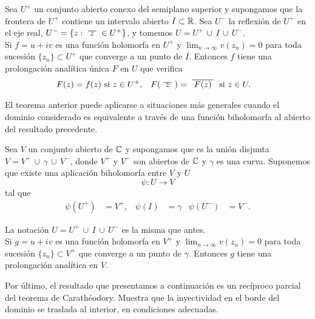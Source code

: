 \begin{theorem}
    Sea $U^+$ un conjunto abierto conexo del semiplano superior y supongamos que la frontera de $U^+$ contiene un intervalo abierto $I \subset \mathbb{R}$. Sea $U^-$ la reflexión de $U^+$ en el eje real, $U^- = \{z: \xbar{z} \in U^+\}$, y  tomemos $U = U^+ \, \cup \, I \, \cup \, U^-$. \\

    Si $f = u + iv$ es una función holomorfa en $U^+$ y $\lim_{n \to \infty} v(z_n) = 0$ para toda sucesión $\{z_n\}\subset U^+$ que converge a un punto de $I$. Entonces $f$ tiene una prolongación analítica única $F$ en $U$ que verifica
    \begin{align*}
        F(z) &= f(z) \text{ si } z\in U^+, & F(\xbar{z}) &= \xbar{F(z)} \text{ si } z\in U.
    \end{align*}
\end{theorem}

El teorema anterior puede aplicarse a situaciones más generales cuando el dominio considerado es equivalente a través de una función biholomorfa al abierto del resultado precedente. \\

\begin{theorem}
    Sea $V$ un conjunto abierto de $\mathbb{C}$ y supongamos que es la unión disjunta $V = V^+ \, \cup \, \gamma \, \cup \, V^-$, donde $V^+$ y $V^-$ son abiertos de $\mathbb{C}$ y $\gamma$ es una curva. Suponemos que existe una aplicación biholomorfa entre $V$ y $U$
    \begin{equation*}
        \psi: U \to V
    \end{equation*}
    tal que
    \begin{align*}
        \psi(U^+) &= V^+, & \psi(I) &= \gamma & \psi(U^-) &= V^-.
    \end{align*}

    La notación $U = U^+ \, \cup \, I \, \cup \, U^-$ es la misma que antes. \\

    Si $g = u + iv$ es una función holomorfa en $V^+$ y $\lim_{n \to \infty} v(z_n) = 0$ para toda sucesión $\{z_n\}\subset V^+$ que converge a un punto de $\gamma$. Entonces $g$ tiene una prolongación analítica en $V$.
\end{theorem}

Por último, el resultado que presentamos a continuación es un recíproco parcial del teorema de Carathéodory. Muestra que la inyectividad en el borde del dominio se traslada al interior, en condiciones adecuadas. \\

